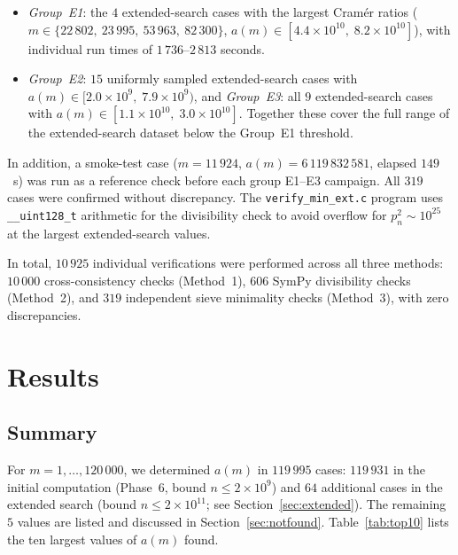 \documentclass[pdflatex,sn-mathphys-num,Numbered]{sn-jnl}
\theoremstyle{thmstyleone}
\theoremstyle{thmstylethree}
\theoremstyle{thmstyletwo}
\numberwithin{equation}{section}
\begin{document}
\begin{enumerate}
\begin{itemize}
		$a(m) > 10^9$ from the initial computation, including
		$m = 14\,740$
		($a(m) = 1{,}994{,}463{,}433$) and $m = 16\,167$
		($a(m) = 1{,}881{,}095{,}843$), the two largest values in
		that dataset.
		\item \emph{Group~E1}: the $4$ extended-search cases with the
		largest Cram\'er ratios
		($m \in \{22\,802,\ 23\,995,\ 53\,963,\ 82\,300\}$,
		$a(m) \in [4.4 \times 10^{10},\; 8.2 \times 10^{10}]$),
		with individual run times of $1\,736$--$2\,813$ seconds.
		\item \emph{Group~E2}: $15$ uniformly sampled extended-search
		cases with $a(m) \in [2.0 \times 10^9,\; 7.9 \times 10^9)$,
		and \emph{Group~E3}: all $9$ extended-search cases with
		$a(m) \in [1.1 \times 10^{10},\; 3.0 \times 10^{10}]$.
		Together these cover the full range of the extended-search
		dataset below the Group~E1 threshold.
	\end{itemize}
	In addition, a smoke-test case ($m = 11\,924$,
	$a(m) = 6\,119\,832\,581$, elapsed $149$~s) was run as a
	reference check before each group E1--E3 campaign.
	All $319$ cases were confirmed without discrepancy.
	The \texttt{verify\_min\_ext.c} program uses \texttt{\_\_uint128\_t}
	arithmetic for the divisibility check to avoid overflow for
	$p_n^2 \sim 10^{25}$ at the largest extended-search values.
\end{enumerate}

In total, $10\,925$ individual verifications were performed across all
three methods: $10\,000$ cross-consistency checks (Method~1),
$606$ SymPy divisibility checks (Method~2), and $319$ independent
sieve minimality checks (Method~3), with zero discrepancies.

\section{Results}
\label{sec:results}

\subsection{Summary}
\label{sec:summary}

For $m = 1, \ldots, 120\,000$, we determined $a(m)$ in $119\,995$ cases:
$119\,931$ in the initial computation (Phase~6, bound
$n \leq 2 \times 10^9$) and $64$ additional cases in the extended
search (bound $n \leq 2 \times 10^{11}$; see
Section~\ref{sec:extended}).
The remaining $5$ values are listed and discussed in
Section~\ref{sec:notfound}.
Table~\ref{tab:top10} lists the ten largest values of $a(m)$ found.
\end{document}
